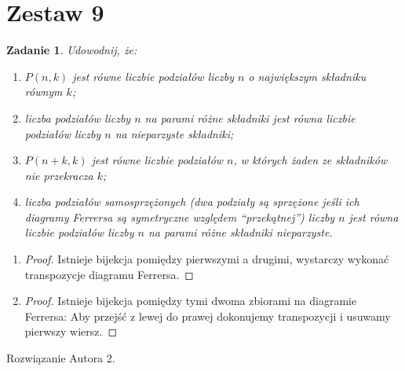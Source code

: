 \documentclass{mwart}
\newtheorem{zad}{Zadanie}[section]
\begin{document}
\newpage
\section{Zestaw 9}          %
\begin{zad}
    Udowodnij, że:
    \begin{enumerate}
        \item  $P(n, k)$ jest równe liczbie podziałów liczby $n$ o największym składniku równym $k$;
        \item liczba podziałów liczby $n$ na parami różne składniki jest równa liczbie podziałów liczby $n$ na nieparzyste składniki;
        \item $P(n + k, k)$ jest równe liczbie podziałów $n$, w których żaden ze składników nie przekracza $k$;
        \item liczba podziałów samosprzężonych (dwa podziały są sprzężone jeśli ich diagramy Ferrersa są symetryczne względem “przekątnej”) liczby $n$ jest równa liczbie podziałów liczby $n$ na parami różne składniki nieparzyste.
    \end{enumerate}
\end{zad}
\begin{mdframed}
    \begin{enumerate}
        \item
              \begin{proof}
                  Istnieje bijekcja pomiędzy pierwszymi a drugimi, wystarczy wykonać transpozycje diagramu Ferrersa.
              \end{proof}

        \item
              \begin{proof}
                  Istnieje bijekcja pomiędzy tymi dwoma zbiorami na diagramie Ferrersa:
                  Aby przejść z lewej do prawej dokonujemy transpozycji i usuwamy pierwszy wiersz.
              \end{proof}

    \end{enumerate}
\end{mdframed}
\begin{mdframed}
    Rozwiązanie Autora 2.
\end{mdframed}
\end{document}
